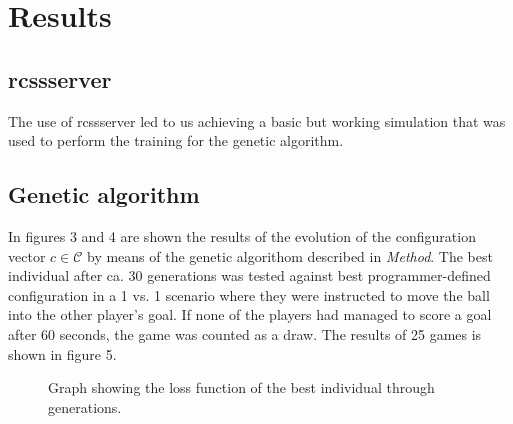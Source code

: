 \section{Results}
\label{section:results}

\subsection{rcssserver}
The use of rcssserver led to us achieving a basic but working simulation that was used to perform the training for the genetic algorithm.

\subsection{Genetic algorithm}
In figures 3 and 4 are shown the results of the evolution of the configuration vector \(c\in\mathcal{C}\) by means of the genetic algorithom described in \textit{Method}. The best individual after ca. 30 generations was tested against best programmer-defined configuration in a 1 vs. 1 scenario where they were instructed to move the ball into the other player's goal. If none of the players had managed to score a goal after 60 seconds, the game was counted as a draw. The results of 25 games is shown in figure 5.

\begin{figure}[tbp]
\centering
{}
	\caption{Graph showing the loss function of the best individual through generations.}
\end{figure}



